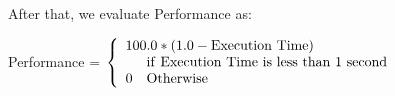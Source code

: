 \documentclass[11pt,a4paper]{article}
\begin{document}
  After that, we evaluate Performance as:

  \begin{mdframed}
    \center
Performance = $\left\{
    \begin{array}{ll}
        \multicolumn{2}{l}{100.0 * (1.0 - {\rm Execution~Time})} \\
          & {\rm if~Execution~Time~is~less~than~1~second}  \\
        0 & {\rm Otherwise}
    \end{array}
    \right.$
  \end{mdframed}




\end{document}
